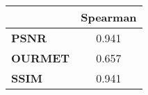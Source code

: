 \begin{tabular}{|l|c|}
\hline
&\textbf{Spearman}\\\hline
\textbf{PSNR}&0.941\\\hline
\textbf{OURMET}&0.657\\\hline
\textbf{SSIM}&0.941\\\hline
\end{tabular}
